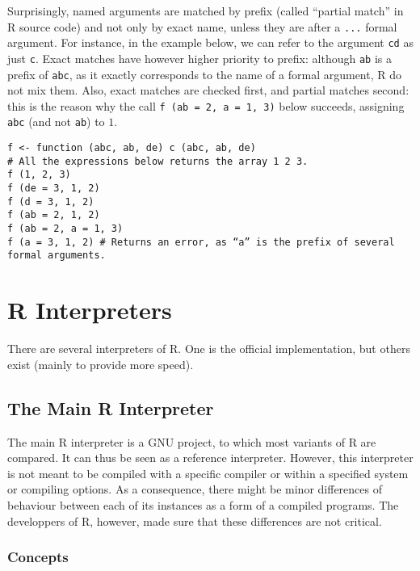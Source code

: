 \documentclass{article}
\newcommand\R{R}
\begin{document}
Surprisingly, named arguments are matched by prefix
(called “partial match” in \R{} source code) and not only by exact name,
unless they are after a \texttt{...} formal argument.
For instance, in the example below,
we can refer to the argument \texttt{cd} as just \texttt{c}.
Exact matches have however higher priority to prefix:
although \texttt{ab} is a prefix of \texttt{abc},
as it exactly corresponds to the name of a formal argument,
\R{} do not mix them.
Also, exact matches are checked first, and partial matches second:
this is the reason why the call \texttt{f (ab = 2, a = 1, 3)}
below succeeds, assigning \texttt{abc}
(and not \texttt{ab}) to \(1\).
\begin{verbatim}
f <- function (abc, ab, de) c (abc, ab, de)
# All the expressions below returns the array 1 2 3.
f (1, 2, 3)
f (de = 3, 1, 2)
f (d = 3, 1, 2)
f (ab = 2, 1, 2)
f (ab = 2, a = 1, 3)
f (a = 3, 1, 2) # Returns an error, as “a” is the prefix of several formal arguments.
\end{verbatim}


\section{\R{} Interpreters}
\label{sec:interpreters}

There are several interpreters of \R{}.
One is the official implementation,
but others exist (mainly to provide more speed).

\subsection{The Main \R{} Interpreter}
\label{sec:main:interpreter}

The main \R{} interpreter is a GNU project,
to which most variants of \R{} are compared.
It can thus be seen as a reference interpreter.
However, this interpreter is not meant to be compiled
with a specific compiler or within a specified system
or compiling options.
As a consequence, there might be minor differences
of behaviour between each of its instances as a form
of a compiled programs.
The developpers of \R{}, however, made sure that these
differences are not critical. %

\subsubsection{Concepts}
\label{sec:concepts}
\end{document}
